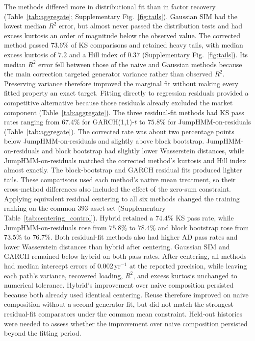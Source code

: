 The methods differed more in distributional fit than in factor
recovery (Table~\ref{tab:aggregate}; Supplementary Fig.~\ref{fig:tails}).
Gaussian SIM had the lowest median $R^2$ error, but almost never
passed the distribution tests and had excess kurtosis an order of
magnitude below the observed value. The corrected method passed $73.6\%$ of KS
comparisons and retained heavy tails, with median excess kurtosis
of $7.2$ and a Hill index of $0.37$ (Supplementary Fig.~\ref{fig:tails}). Its
median $R^2$ error fell between those of the naive and Gaussian
methods because the main correction targeted generator variance
rather than observed $R^2$. Preserving variance therefore improved
the marginal fit without making every fitted property an exact
target.
Fitting directly to regression residuals provided a competitive
alternative because those residuals already excluded the market
component (Table~\ref{tab:aggregate}). The three residual-fit methods had KS pass rates ranging
from $67.4\%$ for GARCH(1,1)-$t$ to $75.8\%$ for
JumpHMM-on-residuals (Table~\ref{tab:aggregate}). The corrected rate
was about two percentage points below JumpHMM-on-residuals and
slightly above block bootstrap. JumpHMM-on-residuals and block
bootstrap had slightly lower Wasserstein distances, while
JumpHMM-on-residuals matched the corrected method's kurtosis and Hill
index almost exactly. The block-bootstrap and GARCH residual fits
produced lighter tails. These comparisons used each method's native
mean treatment, so their cross-method differences also included the
effect of the zero-sum constraint.
Applying equivalent residual centering to all six methods changed the
training ranking on the common $393$-asset set
(Supplementary Table~\ref{tab:centering_control}). Hybrid retained a $74.4\%$ KS
pass rate, while JumpHMM-on-residuals rose from $75.8\%$ to $78.4\%$
and block bootstrap rose from $73.5\%$ to $76.7\%$. Both residual-fit
methods also had higher AD pass rates and lower Wasserstein distances
than hybrid after centering. Gaussian SIM and GARCH remained below
hybrid on both pass rates. After centering, all methods had median
intercept errors of $0.002\,\mathrm{yr}^{-1}$ at the reported precision,
while leaving each path's variance, recovered loading, $R^2$, and
excess kurtosis unchanged to numerical tolerance. Hybrid's improvement
over naive composition persisted because both already used identical
centering. Reuse therefore improved on naive composition without a
second generator fit, but did not match the strongest residual-fit
comparators under the common mean constraint. Held-out histories were
needed to assess whether the improvement over naive composition
persisted beyond the fitting period.

